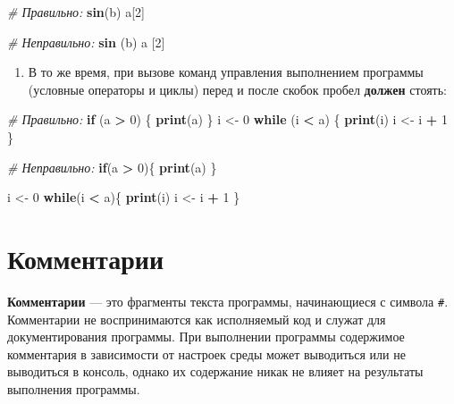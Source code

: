 \documentclass[]{book}
\newenvironment{Shaded}{\begin{snugshade}}{\end{snugshade}}
\newcommand{\KeywordTok}[1]{\textcolor[rgb]{0.13,0.29,0.53}{\textbf{#1}}}
\newcommand{\DecValTok}[1]{\textcolor[rgb]{0.00,0.00,0.81}{#1}}
\newcommand{\StringTok}[1]{\textcolor[rgb]{0.31,0.60,0.02}{#1}}
\newcommand{\CommentTok}[1]{\textcolor[rgb]{0.56,0.35,0.01}{\textit{#1}}}
\newcommand{\ControlFlowTok}[1]{\textcolor[rgb]{0.13,0.29,0.53}{\textbf{#1}}}
\newcommand{\OperatorTok}[1]{\textcolor[rgb]{0.81,0.36,0.00}{\textbf{#1}}}
\newcommand{\NormalTok}[1]{#1}
\providecommand{\tightlist}{%
  \setlength{\itemsep}{0pt}\setlength{\parskip}{0pt}}
\begin{document}
\begin{Shaded}
\begin{Highlighting}[]
\CommentTok{# Правильно:}
\KeywordTok{sin}\NormalTok{(b)}
\NormalTok{a[}\DecValTok{2}\NormalTok{]}

\CommentTok{# Неправильно:}
\KeywordTok{sin}\NormalTok{ (b)}
\NormalTok{a [}\DecValTok{2}\NormalTok{]}
\end{Highlighting}
\end{Shaded}

\begin{enumerate}
\def\labelenumi{\arabic{enumi}.}
\setcounter{enumi}{4}
\tightlist
\item
  В то же время, при вызове команд управления выполнением программы
  (условные операторы и циклы) перед и после скобок пробел
  \textbf{должен} стоять:
\end{enumerate}

\begin{Shaded}
\begin{Highlighting}[]
\CommentTok{# Правильно:}
\ControlFlowTok{if}\NormalTok{ (a }\OperatorTok{>}\StringTok{ }\DecValTok{0}\NormalTok{) \{}
  \KeywordTok{print}\NormalTok{(a)}
\NormalTok{\}}
\NormalTok{i <-}\StringTok{ }\DecValTok{0}
\ControlFlowTok{while}\NormalTok{ (i }\OperatorTok{<}\StringTok{ }\NormalTok{a) \{}
  \KeywordTok{print}\NormalTok{(i)}
\NormalTok{  i <-}\StringTok{ }\NormalTok{i }\OperatorTok{+}\StringTok{ }\DecValTok{1}
\NormalTok{\}}

\CommentTok{# Неправильно:}
\ControlFlowTok{if}\NormalTok{(a }\OperatorTok{>}\StringTok{ }\DecValTok{0}\NormalTok{)\{}
  \KeywordTok{print}\NormalTok{(a)}
\NormalTok{\}}

\NormalTok{i <-}\StringTok{ }\DecValTok{0}
\ControlFlowTok{while}\NormalTok{(i }\OperatorTok{<}\StringTok{ }\NormalTok{a)\{}
  \KeywordTok{print}\NormalTok{(i)}
\NormalTok{  i <-}\StringTok{ }\NormalTok{i }\OperatorTok{+}\StringTok{ }\DecValTok{1}
\NormalTok{\}}
\end{Highlighting}
\end{Shaded}

\section*{Комментарии}

\textbf{Комментарии} --- это фрагменты текста программы, начинающиеся с
символа \texttt{\#}. Комментарии не воспринимаются как исполняемый код и
служат для документирования программы. При выполнении программы
содержимое комментария в зависимости от настроек среды может выводиться
или не выводиться в консоль, однако их содержание никак не влияет на
результаты выполнения программы.
\end{document}
